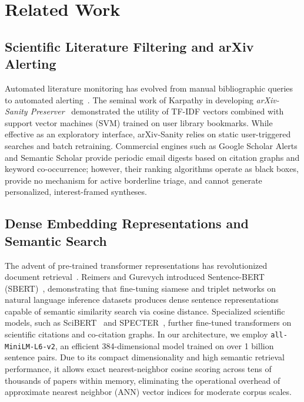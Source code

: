 \section{Related Work}
\label{sec:related_work}

\subsection{Scientific Literature Filtering and arXiv Alerting}
\label{sec:rel_filtering}

Automated literature monitoring has evolved from manual bibliographic queries to automated alerting~\cite{tiropanis2020web,wang2020microsoft}. The seminal work of Karpathy in developing \textit{arXiv-Sanity Preserver}~\cite{karpathy2015arxivsanity} demonstrated the utility of TF-IDF vectors combined with support vector machines (SVM) trained on user library bookmarks. While effective as an exploratory interface, arXiv-Sanity relies on static user-triggered searches and batch retraining. Commercial engines such as Google Scholar Alerts and Semantic Scholar provide periodic email digests based on citation graphs and keyword co-occurrence; however, their ranking algorithms operate as black boxes, provide no mechanism for active borderline triage, and cannot generate personalized, interest-framed syntheses.

\subsection{Dense Embedding Representations and Semantic Search}
\label{sec:rel_embeddings}

The advent of pre-trained transformer representations has revolutionized document retrieval~\cite{vaswani2017attention,manning2008introduction}. Reimers and Gurevych introduced Sentence-BERT (SBERT)~\cite{reimers2019sentencebert}, demonstrating that fine-tuning siamese and triplet networks on natural language inference datasets produces dense sentence representations capable of semantic similarity search via cosine distance. Specialized scientific models, such as SciBERT~\cite{beltagy2019scibert} and SPECTER~\cite{cohan2020specter}, further fine-tuned transformers on scientific citations and co-citation graphs. In our architecture, we employ \texttt{all-MiniLM-L6-v2}, an efficient 384-dimensional model trained on over 1 billion sentence pairs. Due to its compact dimensionality and high semantic retrieval performance, it allows exact nearest-neighbor cosine scoring across tens of thousands of papers within memory, eliminating the operational overhead of approximate nearest neighbor (ANN) vector indices for moderate corpus scales.

